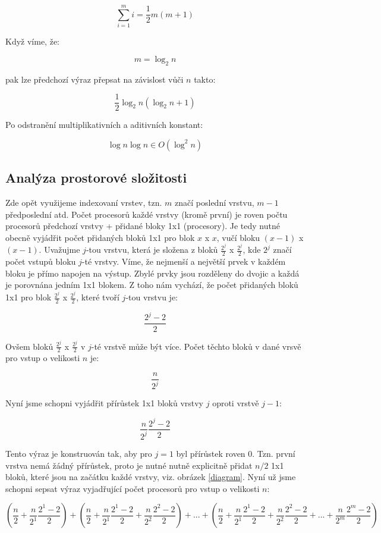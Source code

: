 \documentclass[12pt]{article}
\begin{document}
\[\sum\limits_{i=1}^m i = \frac{1}{2}m(m+1)\]

Když víme, že:

\[m=\log_2 n\]

pak lze předchozí výraz přepsat na závislost vůči \(n\) takto:

\[\frac{1}{2}\log_2 n(\log_2 n+1)\]
 
Po odstranění multiplikativních a aditivních konstant:

\[\log n \log n\in O(\log^2 n)\] 

\subsection{Analýza prostorové složitosti}
Zde opět využijeme indexovaní vrstev, tzn. \(m\) značí poslední vrstvu, \(m-1\) předposlední atd. Počet procesorů každé vrstvy (kromě první) je roven počtu procesorů předchozí vrstvy + přidané bloky 1x1 (procesory). Je tedy nutné obecně vyjádřit počet přidaných bloků 1x1 pro blok \(x\) x \(x\), vučí bloku \((x-1)\) x \((x-1)\). Uvažujme \(j\)-tou vrstvu, která je složena z bloků \(\frac{2^j}{2}\) x \(\frac{2^j}{2}\), kde \(2^j\) značí počet vstupů bloku \(j\)-té vrstvy. Víme, že nejmenší a největší prvek v každém bloku je přímo napojen na výstup. Zbylé prvky jsou rozděleny do dvojic a každá je porovnána jedním 1x1 blokem. Z toho nám vychází, že počet přidaných bloků 1x1 pro blok \(\frac{2^j}{2}\) x \(\frac{2^j}{2}\), které tvoří \(j\)-tou vrstvu je:

\[\frac{2^j - 2}{2}\]

Ovšem bloků \(\frac{2^j}{2}\) x \(\frac{2^j}{2}\) v \(j\)-té vrstvě může být více. Počet těchto bloků v dané vrsvě pro vstup o velikosti \(n\) je:

\[\frac{n}{2^j}\]

Nyní jsme schopni vyjádřit přírůstek 1x1 bloků vrstvy \(j\) oproti vrstvě \(j-1\):

\[\frac{n}{2^j}\frac{2^j - 2}{2}\]

Tento výraz je konstruován tak, aby pro \(j=1\) byl přírůstek roven 0. Tzn. první vrstva nemá žádný přírůstek, proto je nutné nutně explicitně přidat \(n/2\) 1x1 bloků, které jsou na začátku každé vrstvy, viz. obrázek \ref{diagram}. Nyní už jsme schopni sepsat výraz vyjadřující počet procesorů pro vstup o velikosti \(n\):

\[(\frac{n}{2}+\frac{n}{2^1}\frac{2^1 - 2}{2}) + 
  (\frac{n}{2}+\frac{n}{2^1}\frac{2^1 - 2}{2} + \frac{n}{2^2}\frac{2^2 - 2}{2}) +
   ... + 
  (\frac{n}{2}+\frac{n}{2^1}\frac{2^1 - 2}{2} + \frac{n}{2^2}\frac{2^2 - 2}{2} + ... + \frac{n}{2^m}\frac{2^m - 2}{2})\]
\end{document}
